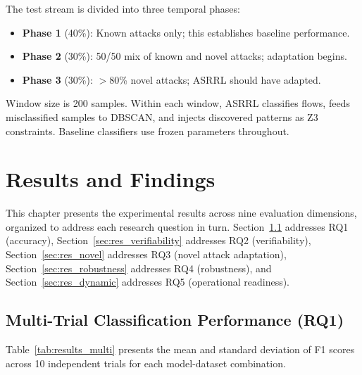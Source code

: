 \documentclass[12pt, letterpaper, oneside]{report}
\newcommand{\ASRRL}{\textsc{ASRRL}}
\begin{document}
\noindent The test stream is divided into three temporal phases:
\begin{itemize}
    \item \textbf{Phase 1} (40\%): Known attacks only; this establishes baseline performance.
    \item \textbf{Phase 2} (30\%): 50/50 mix of known and novel attacks; adaptation begins.
    \item \textbf{Phase 3} (30\%): $>$80\% novel attacks; \ASRRL{} should have adapted.
\end{itemize}

Window size is 200 samples. Within each window, \ASRRL{} classifies flows, feeds misclassified samples to DBSCAN, and injects discovered patterns as Z3 constraints. Baseline classifiers use frozen parameters throughout.



\chapter{Results and Findings}
\label{ch:findings}

This chapter presents the experimental results across nine evaluation dimensions, organized to address each research question in turn. Section~\ref{sec:res_multi_trial} addresses RQ1 (accuracy), Section~\ref{sec:res_verifiability} addresses RQ2 (verifiability), Section~\ref{sec:res_novel} addresses RQ3 (novel attack adaptation), Section~\ref{sec:res_robustness} addresses RQ4 (robustness), and Section~\ref{sec:res_dynamic} addresses RQ5 (operational readiness).


\section{Multi-Trial Classification Performance (RQ1)}
\label{sec:res_multi_trial}

Table~\ref{tab:results_multi} presents the mean and standard deviation of F1 scores across 10 independent trials for each model-dataset combination.
\end{document}
